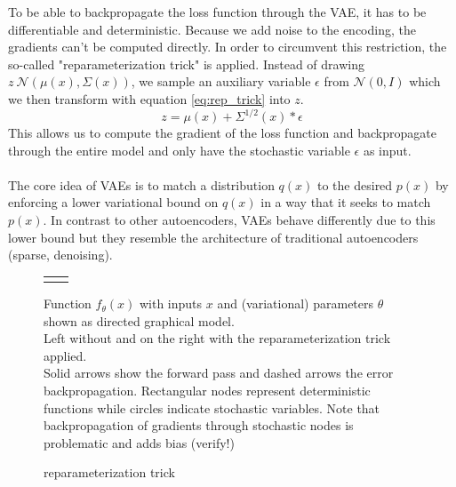 To be able to backpropagate the loss function through the VAE, it has to be differentiable and deterministic.
Because we add noise to the encoding, the gradients can't be computed directly. In order to circumvent this restriction, the so-called "reparameterization trick" is applied.
Instead of drawing $z ~ \mathcal{N}(\mu(x), \Sigma(x))$, we sample an auxiliary variable $\epsilon$ from $\mathcal{N}(0, I)$ which we then transform with equation \ref{eq:rep_trick} into $z$.
\begin{equation}
  \label{eq:rep_trick}
  z = \mu(x) + \Sigma^{1/2}(x)*\epsilon
\end{equation}
This allows us to compute the gradient of the loss function and backpropagate through the entire model and only have the stochastic variable $\epsilon$ as input.\\\\

The core idea of VAEs is to match a distribution $q(x)$ to the desired $p(x)$ by enforcing a lower variational bound on $q(x)$ in a way that it seeks to match $p(x)$.
In contrast to other autoencoders, VAEs behave differently due to this lower bound but they resemble the architecture of traditional autoencoders (sparse, denoising).

\begin{figure}
  \centering
  \begin{tabular}{c:c}
      \quad \quad
    &
      \quad

    \\
  \end{tabular}
  \caption{reparameterization trick}
  \medskip
  \small
  Function $f_\theta(x)$ with inputs $x$ and (variational) parameters $\theta$ shown as directed graphical model.\\
  Left without and on the right with the reparameterization trick applied.\\
  Solid arrows show the forward pass and dashed arrows the error backpropagation.
  Rectangular nodes represent deterministic functions while circles indicate stochastic variables.
  Note that backpropagation of gradients through stochastic nodes is problematic and adds bias (verify!)
\end{figure}




